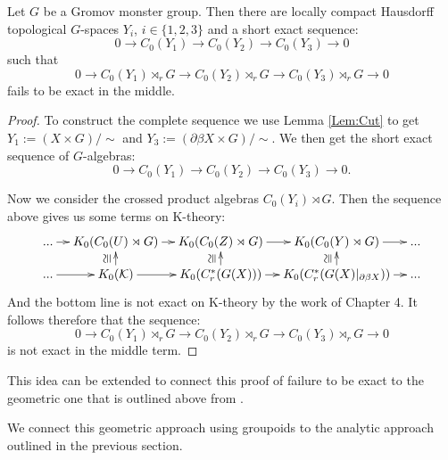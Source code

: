 \begin{example}
\begin{theorem}\label{Thm:GM1}
Let $G$ be a Gromov monster group. Then there are locally compact Hausdorff topological $G$-spaces $Y_{i}$, $i \in \lbrace 1,2,3 \rbrace$ and a short exact sequence:
\begin{equation*}
0 \rightarrow C_{0}(Y_{1}) \rightarrow C_{0}(Y_{2}) \rightarrow C_{0}(Y_{3}) \rightarrow 0
\end{equation*}
such that
\begin{equation*}
0 \rightarrow C_{0}(Y_{1})\rtimes_{r} G \rightarrow C_{0}(Y_{2})\rtimes_{r} G \rightarrow C_{0}(Y_{3})\rtimes_{r} G \rightarrow 0
\end{equation*}
fails to be exact in the middle.
\end{theorem}
\begin{proof}
To construct the complete sequence we use Lemma \ref{Lem:Cut} to get $Y_{1}:= (X \times G)/\sim$ and $Y_{3}:= (\partial\beta X \times G)/\sim$. We then get the short exact sequence of $G$-algebras:
\begin{equation*}
0 \rightarrow C_{0}(Y_{1}) \rightarrow C_{0}(Y_{2}) \rightarrow C_{0}(Y_{3}) \rightarrow 0.
\end{equation*}

Now we consider the crossed product algebras $C_{0}(Y_{i})\rtimes G$. Then the sequence above gives us some terms on K-theory: 
\begin{equation*}
\xymatrix@=1em{...\ar[r] & K_{0}(C_{0}(U)\rtimes G) \ar[r]& K_{0}(C_{0}(Z)\rtimes G) \ar[r]& K_{0}(C_{0}(Y)\rtimes G)\ar[r] & ...\\
...\ar[r] & K_{0}(\mathcal{K}) \ar[r]\ar[u]^{\ucong}& K_{0}(C^{*}_{r}(G(X))) \ar[r]\ar[u]^{\ucong}& K_{0}(C^{*}_{r}(G(X)|_{\partial\beta X})) \ar[r]\ar[u]^{\ucong}& ...}
\end{equation*}
And the bottom line is not exact on K-theory by the work of Chapter 4. It follows therefore that the sequence:
\begin{equation*}
0 \rightarrow C_{0}(Y_{1})\rtimes_{r} G \rightarrow C_{0}(Y_{2})\rtimes_{r} G \rightarrow C_{0}(Y_{3})\rtimes_{r} G \rightarrow 0
\end{equation*}
is not exact in the middle term.
\end{proof}

This idea can be extended to connect this proof of failure to be exact to the geometric one that is outlined above from \cite{higsonpreprint,explg1}. 

We connect this geometric approach using groupoids to the analytic approach outlined in the previous section. 


\end{example}

